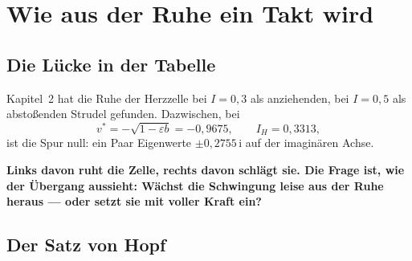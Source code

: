 \chapter{Wie aus der Ruhe ein Takt wird}

\section{Die Lücke in der Tabelle}

\begin{merksatz}
Kapitel~2 hat die Ruhe der Herzzelle bei $I = 0{,}3$ als anziehenden, bei $I = 0{,}5$ als abstoßenden Strudel gefunden. Dazwischen, bei
\[ v^{*} = -\sqrt{1 - \varepsilon b} = -0{,}9675, \qquad I_H = 0{,}3313 , \]
ist die Spur null: ein Paar Eigenwerte $\pm0{,}2755\,\mathrm i$ auf der imaginären Achse.

\begin{center}
\begin{minipage}{0.9\textwidth}
\textbf{Links davon ruht die Zelle, rechts davon schlägt sie. Die Frage ist, wie der Übergang aussieht: Wächst die Schwingung leise aus der Ruhe heraus --- oder setzt sie mit voller Kraft ein?}
\end{minipage}
\end{center}

\begin{center}
\begin{minipage}{0.88\textwidth}
\end{minipage}
\end{center}
\end{merksatz}

\section{Der Satz von Hopf}

